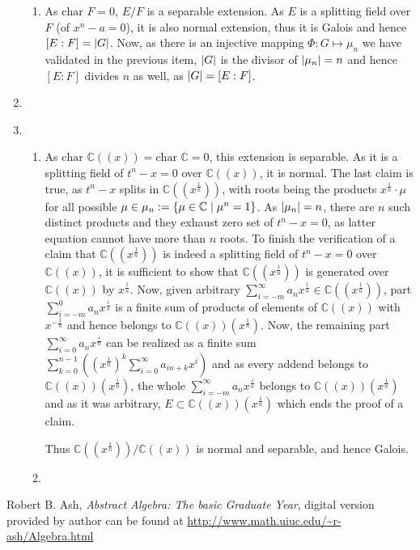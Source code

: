 \documentclass[8pt]{article} %
\begin{document}
\begin{enumerate}[label=\bfseries Problem \arabic*.]
{\begin{enumerate}[label=(\arabic*).]
{				Now, if $\Phi(\sigma)=\sigma(\alpha)/\alpha=1$
				for $\sigma\in Gal(E/F)$, this means that $\forall\alpha,\;\alpha^n=a\implies\sigma(\alpha)=\alpha$, thus $\sigma$ fixes
				zeros of $x^n-a=0$. As splitting field $E$ is generated by zeros of $x^n-a$, the fact that $\sigma$ fixes these zeros as well as $F$
				implies that $\sigma$ fixes $E$, that is $\sigma=id_E$ and this shows injectiveness.
				}
			\item{As $\mbox{char }F=0$, $E/F$ is a separable extension. As $E$ is a splitting field over $F$ (of $x^n-a=0$), it is also normal extension,
				thus it is Galois and hence $[E:F]=\left|G\right|$. Now, as there is an injective mapping $\Phi:G\mapsto \mu_n$ we have validated
				in the previous item, $\left|G\right|$ is the divisor of $\left|\mu_n\right|=n$ and hence $[E:F]$ divides $n$ as well, as $\left|G\right|=[E:F]$.
				}
		\end{enumerate}
		}
	\item{
		}
	\item{
		\begin{enumerate}[label=(\arabic*).]
			\newcommand{\E}{\mathbb{C}((x^{\frac{1}{n}}))}
			\newcommand{\F}{\mathbb{C}((x))}
			\item{As $\mbox{char }\mathbb{C}((x))=\mbox{char }\mathbb{C}=0$, this extension is separable. As it is a splitting field of $t^n-x=0$ over
				$\mathbb{C}((x))$, it is normal. The last claim is true, as $t^n-x$ splits in $\mathbb{C}((x^{\frac{1}{n}}))$, with roots
				being the products $x^{\frac{1}{n}}\cdot\mu$ for all possible $\mu\in\mu_n:=\left\{\mu\in\mathbb{C}\mid \mu^n=1\right\}$. As
				$\left|\mu_n\right|=n$, there are $n$ such distinct products and they exhaust zero set of $t^n-x=0$, as latter equation cannot
				have more than $n$ roots. To finish the verification of a claim that $\mathbb{C}((x^{\frac{1}{n}}))$ is indeed a splitting field
				of $t^n-x=0$ over $\mathbb{C}((x))$, it is sufficient to show that $\E$ is generated over $\F$ by $x^{\frac{1}{n}}$.
				Now, given arbitrary $\sum_{i=-m}^{\infty}a_nx^{\frac{i}{n}}\in\E$, part $\sum_{i=-m}^0a_nx^{\frac{i}{n}}$ is a finite sum
				of products of elements of $\F$ with $x^{-\frac{1}{n}}$ and hence belongs to $\F(x^{\frac{1}{n}})$. Now, the remaining
				part $\sum_{i=0}^\infty a_nx^{\frac{i}{n}}$ can be realized as a finite sum
				$\sum_{k=0}^{n-1}\left((x^{\frac{1}{n}})^k\sum_{i=0}^\infty a_{in+k}x^i\right)$ and as every addend belongs to
				$\F(x^{\frac{1}{n}})$, the whole $\sum_{i=-m}^{\infty}a_nx^{\frac{i}{n}}$ belongs to $\F(x^{\frac{1}{n}})$ and as it was
				arbitrary, $E\subset\F(x^{\frac{1}{n}})$ which ends the proof of a claim.

				Thus $\E/\F$ is normal and separable, and hence Galois. 
				}
			\item{
				}
		\end{enumerate}
		}
\end{enumerate}
\begin{thebibliography}{9}
	 Robert B. Ash, {\em Abstract Algebra: The basic Graduate Year}, digital version provided by author can be found at
		\url{http://www.math.uiuc.edu/~r-ash/Algebra.html}
\end{thebibliography}
\end{document}
